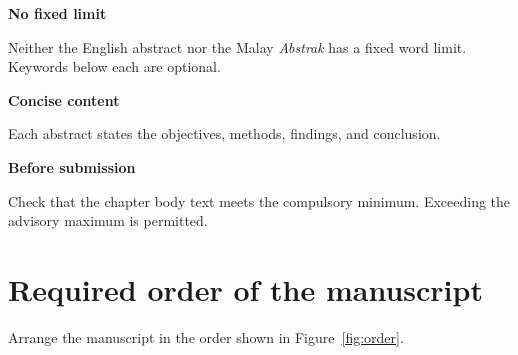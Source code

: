 \documentclass[11pt,a4paper]{article}
\newenvironment{infogrid}[1]
  {\par\vspace{2pt}\begin{tcbraster}[raster columns=#1,raster equal height=rows,
     raster column skip=6pt,raster row skip=6pt]}
  {\end{tcbraster}\par\vspace{4pt}}
\newcommand\tile[2]{\begin{tcolorbox}[igtile]{\color{iucpurple}\bfseries #1}\par
  \vspace{2pt}#2\end{tcolorbox}}
\begin{document}
\begin{infogrid}{3}
\tile{No fixed limit}{Neither the English abstract nor the Malay \emph{Abstrak}
  has a fixed word limit. Keywords below each are optional.}
\tile{Concise content}{Each abstract states the objectives, methods, findings,
  and conclusion.}
\tile{Before submission}{Check that the chapter body text meets the compulsory
  minimum. Exceeding the advisory maximum is permitted.}
\end{infogrid}

\section{Required order of the manuscript}

Arrange the manuscript in the order shown in Figure~\ref{fig:order}.
\end{document}
